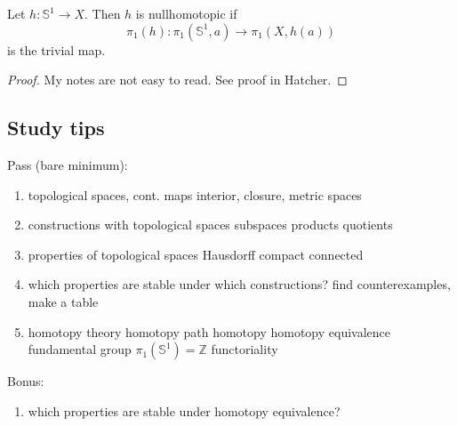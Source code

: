 \begin{lemma}
    Let \( h: \mathbb{S}^1 \to X \).
    Then \( h \) is nullhomotopic
    if
    \[
      \pi_1(h): \pi_1(\mathbb{S}^1, a) \to \pi_1(X, h(a))
    \]
    is the trivial map.
\end{lemma}

\begin{proof}
    My notes are not easy to read.
    See proof in Hatcher.
\end{proof}

\subsection{Study tips}
Pass (bare minimum):
\begin{enumerate}
  \item topological spaces, cont. maps
    \subitem interior, closure, metric spaces
  \item constructions with topological spaces
    \subitem subspaces
    \subitem products
    \subitem quotients
  \item properties of topological spaces
    \subitem Hausdorff
    \subitem compact
    \subitem connected
  \item which properties are stable under which constructions?
    \subitem find counterexamples, make a table
  \item homotopy theory
    \subitem homotopy
    \subitem path homotopy
    \subitem homotopy equivalence
    \subitem fundamental group
    \subitem \( \pi_1(\mathbb{S}^1) = \mathbb{Z} \)
    \subitem functoriality
\end{enumerate}

Bonus:
\begin{enumerate}
  \item which properties are stable under homotopy equivalence?
\end{enumerate}

